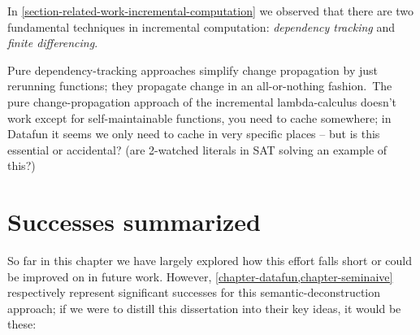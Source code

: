 
In \cref{section-related-work-incremental-computation} we observed that there are two fundamental techniques in incremental computation: \emph{dependency tracking} and \emph{finite differencing}. \XXX

Pure dependency-tracking approaches simplify change propagation by just rerunning functions; they propagate change in an all-or-nothing fashion.\footnotemark\ The pure change-propagation approach of the incremental lambda-calculus doesn't work except for self-maintainable functions, you need to cache somewhere; in Datafun it seems we only need to cache in very specific places -- but is this essential or accidental? (are 2-watched literals in SAT solving an example of this?)




\section{Successes summarized}

So far in this chapter we have largely explored how this effort falls short or could be improved on in future work.
%
However, \cref{chapter-datafun,chapter-seminaive} respectively represent
significant successes for this semantic-deconstruction approach; if we were to
distill this dissertation into their key ideas, it would be these:


